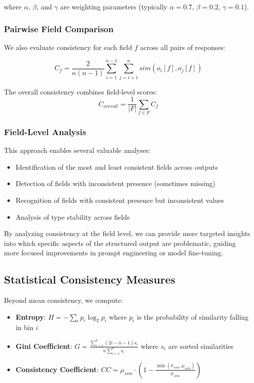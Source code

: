 \documentclass[letterpaper]{article} %
\begin{document}
where $\alpha$, $\beta$, and $\gamma$ are weighting parameters (typically $\alpha = 0.7$, $\beta = 0.2$, $\gamma = 0.1$).

\subsubsection{Pairwise Field Comparison}

We also evaluate consistency for each field $f$ across all pairs of responses:

\begin{equation}
C_f = \frac{2}{n(n-1)} \sum_{i=1}^{n-1} \sum_{j=i+1}^{n} sim(o_i[f], o_j[f])
\end{equation}

The overall consistency combines field-level scores:
\begin{equation}
C_{overall} = \frac{1}{|F|} \sum_{f \in F} C_f
\end{equation}

\subsubsection{Field-Level Analysis}

This approach enables several valuable analyses:
\begin{itemize}
\item Identification of the most and least consistent fields across outputs
\item Detection of fields with inconsistent presence (sometimes missing)
\item Recognition of fields with consistent presence but inconsistent values
\item Analysis of type stability across fields
\end{itemize}

By analyzing consistency at the field level, we can provide more targeted insights into which specific aspects of the structured output are problematic, guiding more focused improvements in prompt engineering or model fine-tuning.

\subsection{Statistical Consistency Measures}

Beyond mean consistency, we compute:

\begin{itemize}
\item \textbf{Entropy}: $H = -\sum_i p_i \log_2 p_i$ where $p_i$ is the probability of similarity falling in bin $i$
\item \textbf{Gini Coefficient}: $G = \frac{\sum_{i=1}^n (2i - n - 1)s_i}{n\sum_{i=1}^n s_i}$ where $s_i$ are sorted similarities
\item \textbf{Consistency Coefficient}: $CC = \mu_{sim} \cdot (1 - \frac{\min(\sigma_{sim}, \mu_{sim})}{\mu_{sim}})$
\end{itemize}
\end{document}

